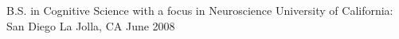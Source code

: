 

\begin{cventries}

  \cventry
    {B.S. in Cognitive Science with a focus in Neuroscience} %
    {University of California: San Diego} %
    {La Jolla, CA} %
    {June 2008} %
    {
      \begin{cvitems} %
      \end{cvitems}
    }

\end{cventries}
